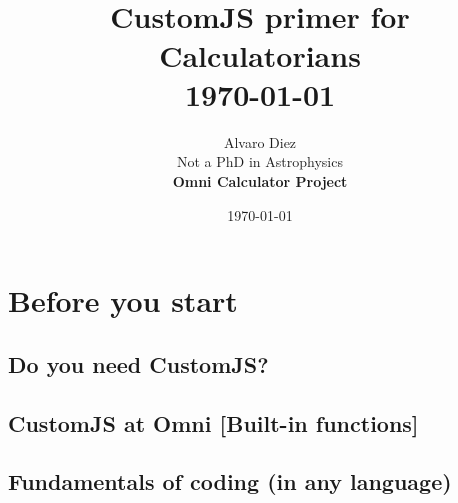 \documentclass[11pt,a4paper,oldfontcommands]{memoir}
\begin{document}
%
%
\thispagestyle{empty}

{%

\centering
\title{ \normalsize \textsc{}
		\\ [2.0cm]
		\hline \vspace{10pt} \\
		\huge \textbf{CustomJS primer for Calculatorians\textsuperscript{\textregistered}} \vspace{5pt}
		\textbf{\hline}{\hline} \\ [0.5cm]
		\normalsize \today \vspace{100pt}\\}		
		}

\date{\today}

\author{\LARGE Alvaro Diez \\
		Not a PhD in Astrophysics\texttrademark \\
		\large \textbf{Omni Calculator Project}}

\maketitle
\clearpage

\tableofcontents

\clearpage


\chapter{Before you start}

\section{Do you need CustomJS?}


\section{CustomJS at Omni \small{[Built-in functions]}}


\section{Fundamentals of coding (in any language)}

\end{document}

